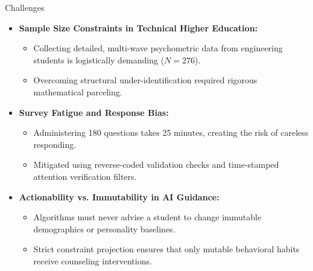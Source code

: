 \documentclass{beamer}
\begin{document}
\begin{frame}{Challenges}
  \begin{itemize}\setlength{\itemsep}{9pt}
    \item \textbf{Sample Size Constraints in Technical Higher Education:}
    \begin{itemize}\setlength{\itemsep}{4pt}
      \item Collecting detailed, multi-wave psychometric data from engineering students is logistically demanding ($N=276$).
      \item Overcoming structural under-identification required rigorous mathematical parceling.
    \end{itemize}
    
    \item \textbf{Survey Fatigue and Response Bias:}
    \begin{itemize}\setlength{\itemsep}{4pt}
      \item Administering 180 questions takes 25 minutes, creating the risk of careless responding.
      \item Mitigated using reverse-coded validation checks and time-stamped attention verification filters.
    \end{itemize}
    
    \item \textbf{Actionability vs. Immutability in AI Guidance:}
    \begin{itemize}\setlength{\itemsep}{4pt}
      \item Algorithms must never advise a student to change immutable demographics or personality baselines.
      \item Strict constraint projection ensures that only mutable behavioral habits receive counseling interventions.
    \end{itemize}
  \end{itemize}
\end{frame}
\end{document}
